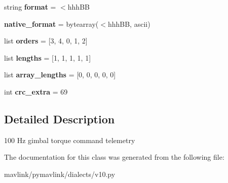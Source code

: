 \begin{DoxyCompactItemize}
string {\bfseries format} = \textquotesingle{}$<$hhh\+BB\textquotesingle{}
\item 
\mbox{\label{classpymavlink_1_1dialects_1_1v10_1_1MAVLink__gimbal__torque__cmd__report__message_a568178f6f00e5ab0f5424f8b630179bf}} 
{\bfseries native\+\_\+format} = bytearray(\textquotesingle{}$<$hhh\+BB\textquotesingle{}, \textquotesingle{}ascii\textquotesingle{})
\item 
\mbox{\label{classpymavlink_1_1dialects_1_1v10_1_1MAVLink__gimbal__torque__cmd__report__message_a8be5f62fd6bb88001c97c06dc6f3f5bc}} 
list {\bfseries orders} = \mbox{[}3, 4, 0, 1, 2\mbox{]}
\item 
\mbox{\label{classpymavlink_1_1dialects_1_1v10_1_1MAVLink__gimbal__torque__cmd__report__message_a0248871f88e92cc6e493b0c1210b9a12}} 
list {\bfseries lengths} = \mbox{[}1, 1, 1, 1, 1\mbox{]}
\item 
\mbox{\label{classpymavlink_1_1dialects_1_1v10_1_1MAVLink__gimbal__torque__cmd__report__message_aa9ae22152b5b7ac56c6dc8415ad0f3d5}} 
list {\bfseries array\+\_\+lengths} = \mbox{[}0, 0, 0, 0, 0\mbox{]}
\item 
\mbox{\label{classpymavlink_1_1dialects_1_1v10_1_1MAVLink__gimbal__torque__cmd__report__message_ac46d4ff6261d14e90ae94908af580e30}} 
int {\bfseries crc\+\_\+extra} = 69
\end{DoxyCompactItemize}


\subsection{Detailed Description}
\begin{DoxyVerb}100 Hz gimbal torque command telemetry
\end{DoxyVerb}
 

The documentation for this class was generated from the following file\+:\begin{DoxyCompactItemize}
\item 
mavlink/pymavlink/dialects/v10.\+py\end{DoxyCompactItemize}
